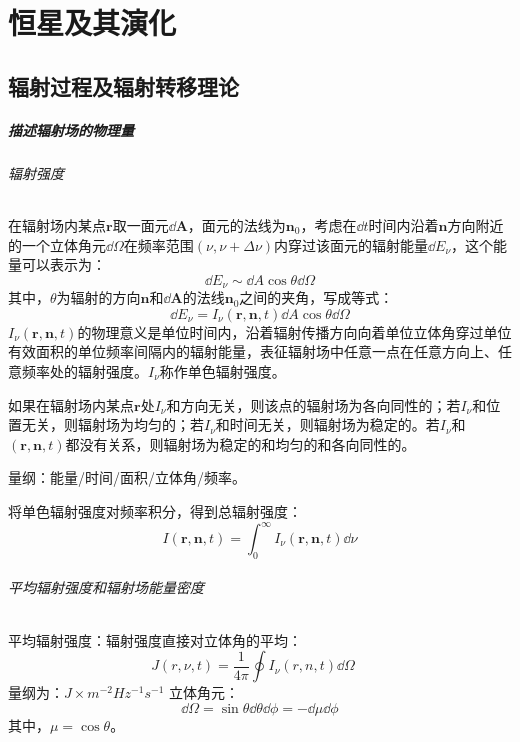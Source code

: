\chapter{恒星及其演化}
\section{辐射过程及辐射转移理论 }
\paragraph{描述辐射场的物理量}
\subparagraph{辐射强度}
在辐射场内某点$\boldsymbol{r}$取一面元$\dd \boldsymbol{A}$，面元的法线为$\boldsymbol{n}_{0}$，考虑在$\dd t$时间内沿着$\boldsymbol{n}$方向附近的一个立体角元$\dd \Omega$在频率范围$\left(\nu ,\nu+\Delta \nu\right)$内穿过该面元的辐射能量$\dd E_{\nu}$，这个能量可以表示为：
\begin{equation}
	\dd E_{\nu}\sim \dd A\cos \theta \dd \Omega
\end{equation}
其中，$\theta$为辐射的方向$\boldsymbol{n}$和$\dd \boldsymbol{A}$的法线$\boldsymbol{n}_{0}$之间的夹角，写成等式：
\begin{equation}
	\dd E_{\nu}=I_{\nu}\left(\boldsymbol{r},\boldsymbol{n},t\right) \dd A\cos \theta \dd \Omega
\end{equation}
$I_{\nu}\left(\boldsymbol{r},\boldsymbol{n},t\right)$的物理意义是单位时间内，沿着辐射传播方向向着单位立体角穿过单位有效面积的单位频率间隔内的辐射能量，表征辐射场中任意一点在任意方向上、任意频率处的辐射强度。$I_{\nu}$称作单色辐射强度。

如果在辐射场内某点$\boldsymbol{r}$处$I_{\nu}$和方向无关，则该点的辐射场为各向同性的；若$I_{\nu}$和位置无关，则辐射场为均匀的；若$I_{\nu}$和时间无关，则辐射场为稳定的。若$I_{\nu}$和$\left(\boldsymbol{r},\boldsymbol{n},t\right)$都没有关系，则辐射场为稳定的和均匀的和各向同性的。

量纲：能量/时间/面积/立体角/频率。

将单色辐射强度对频率积分，得到总辐射强度：
\begin{equation}
	I\left(\boldsymbol{r},\boldsymbol{n},t\right)=\int_{0}^{\infty}I_{\nu}\left(\boldsymbol{r},\boldsymbol{n},t\right)\dd \nu
\end{equation}
\subparagraph{平均辐射强度和辐射场能量密度}
平均辐射强度：辐射强度直接对立体角的平均：
\begin{equation}
	J(r,\nu,t)=\frac{1}{4\pi}\oint I_{\nu}\left(r,n,t\right)\dd \Omega\quad
\end{equation}
量纲为：$J\times m^{-2}Hz^{-1}s^{-1}$
立体角元：
\begin{equation}
	\dd\Omega=\sin \theta \dd \theta \dd \phi =-\dd \mu \dd \phi
\end{equation}
其中，$\mu=\cos \theta$。

